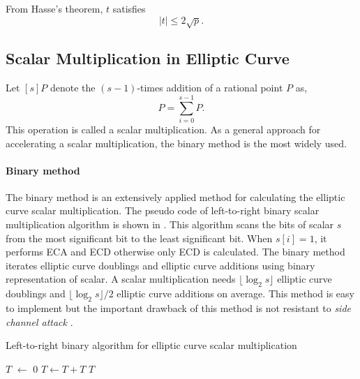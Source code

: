 From Hasse's theorem, $t$ satisfies
\begin{equation}
|t| \leq 2\sqrt{p}.
\end{equation}

\subsection{Scalar Multiplication in Elliptic Curve}
\label{sec:chap:fund:scm}
Let $[s]P$ denote the $(s-1)$-times addition of a rational point $P$ as, 
\begin{equation}
[s]P = \sum_{i = 0}^{s-1}{P}.
\end{equation}
This operation is called a scalar multiplication.
As a general approach for accelerating a scalar multiplication, the binary method is the most widely used.

\paragraph{Binary method}
\label{sec:chap:fund:binscm}
The binary method is an extensively applied method for calculating the elliptic curve scalar multiplication. 
 The pseudo code of left-to-right binary scalar multiplication algorithm is shown in . 
 This algorithm scans the bits of scalar $s$ from the  most significant bit to the least significant bit. When $s[i] = 1$, it  performs ECA and ECD otherwise only ECD is calculated. 
 The binary method iterates elliptic curve doublings and elliptic curve additions using binary representation of scalar.
 A scalar multiplication needs $\lfloor \log_2 s\rfloor$ elliptic curve doublings and $\lfloor \log_2 s\rfloor/2$ elliptic curve additions on average.
  This method is easy to implement but the important drawback of this method is not resistant to \textit{side channel attack} \cite{C:Kocher96}.  

\begin{algorithm}[ht]
	\caption{Left-to-right binary algorithm for elliptic curve scalar multiplication}
	\label{alg:binary_scm_chap_fundamental}
	\DontPrintSemicolon
	 $T$ $ \leftarrow$ $0$ \;
	  {\;
				$T \leftarrow T  + T$\;
		     }
	  $T$\;
\end{algorithm}

